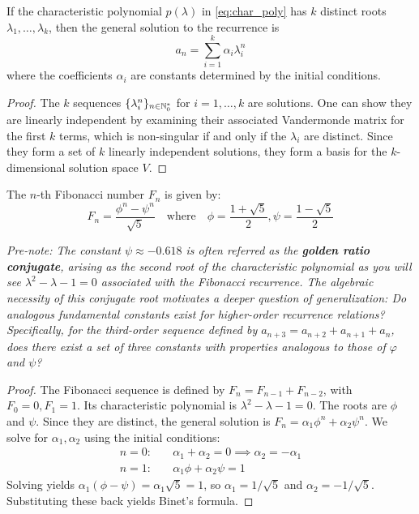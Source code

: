 \begin{theorem}
If the characteristic polynomial $p(\lambda)$ in \eqref{eq:char_poly} has $k$ distinct roots $\lambda_1, \dots, \lambda_k$, then the general solution to the recurrence is
$$ a_n = \sum_{i=1}^{k} \alpha_i \lambda_i^n $$
where the coefficients $\alpha_i$ are constants determined by the initial conditions.
\end{theorem}
\begin{proof}
The $k$ sequences $\{\lambda_i^n\}_{n \in \mathbb{N}_{0}^*}$ for $i=1, \dots, k$ are solutions. One can show they are linearly independent by examining their associated Vandermonde matrix for the first $k$ terms, which is non-singular if and only if the $\lambda_i$ are distinct. Since they form a set of $k$ linearly independent solutions, they form a basis for the $k$-dimensional solution space $V$.
\end{proof}

\begin{corollary}
The $n$-th Fibonacci number $F_n$ is given by:
$$ F_n = \frac{\phi^n - \psi^n}{\sqrt{5}} \quad \text{where} \quad \phi = \frac{1+\sqrt{5}}{2}, \psi = \frac{1-\sqrt{5}}{2} $$
\end{corollary}
\textit{Pre-note: The constant $\psi \approx -0.618$ is often referred as the \textbf{golden ratio conjugate}, arising as the second root of the characteristic polynomial as you will see $\lambda^2 - \lambda - 1 = 0$ associated with the Fibonacci recurrence. The algebraic necessity of this conjugate root motivates a deeper question of generalization: Do analogous fundamental constants exist for higher-order recurrence relations? Specifically, for the third-order sequence defined by $a_{n+3} = a_{n+2} + a_{n+1} + a_n$, does there exist a set of three constants with properties analogous to those of $\varphi$ and $\psi$?}
\begin{proof}
The Fibonacci sequence is defined by $F_n = F_{n-1} + F_{n-2}$, with $F_0=0, F_1=1$. Its characteristic polynomial is $\lambda^2 - \lambda - 1 = 0$. The roots are $\phi$ and $\psi$. Since they are distinct, the general solution is $F_n = \alpha_1 \phi^n + \alpha_2 \psi^n$. We solve for $\alpha_1, \alpha_2$ using the initial conditions:
\begin{align*}
    n=0: & \quad \alpha_1 + \alpha_2 = 0 \implies \alpha_2 = -\alpha_1 \\
    n=1: & \quad \alpha_1 \phi + \alpha_2 \psi = 1
\end{align*}
Solving yields $\alpha_1 (\phi - \psi) = \alpha_1 \sqrt{5} = 1$, so $\alpha_1 = 1/\sqrt{5}$ and $\alpha_2 = -1/\sqrt{5}$. Substituting these back yields Binet's formula.
\end{proof}

